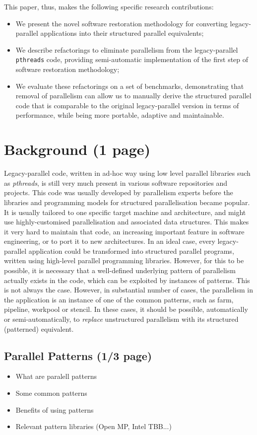 \documentclass{llncs}
\begin{document}
This paper, thus, makes the following specific research contributions:
\begin{itemize}
    \item We present the novel software restoration methodology for converting legacy-parallel applications into their structured parallel equivalents;
    \item We describe refactorings to eliminate parallelism from the legacy-parallel \lstinline{pthreads} code, providing semi-automatic implementation of the first step of software restoration methodology;
    \item We evaluate these refactorings on a set of benchmarks, demonstrating that removal of parallelism can allow us to manually derive the structured parallel code that is comparable to the original legacy-parallel version in terms of performance, while being more portable, adaptive and maintainable.
\end{itemize}

\section{Background (1 page)}
Legacy-parallel code, written in ad-hoc way using low level parallel libraries such as \emph{pthreads}, is still very much present in various software repositories and projects. This code was usually developed by parallelism experts before the libraries and programming models for structured parallelisation became popular. It is usually tailored to one specific target machine and architecture, and might use highly-customised parallelisation and associated data structures. This makes it very hard to maintain that code, an increasing important feature in software engineering, or to port it to new architectures. In an ideal case, every legacy-parallel application could be transformed into structured parallel programs, written using high-level parallel programming libraries. However, for this to be possible, it is necessary that a well-defined underlying pattern of parallelism actually exists in the code, which can be exploited by instances of patterns. This is not always the case. However, in substantial number of cases, the parallelism in the application is an instance of one of the common patterns, such as farm, pipeline, workpool or stencil. In these cases, it should be possible, automatically or semi-automatically, to \emph{replace} unstructured parallelism with its structured (patterned) equivalent.   

\subsection{Parallel Patterns (1/3 page)}
\begin{itemize}
\item What are paralell patterns
\item Some common patterns
  \item Benefits of using patterns
  \item Relevant pattern libraries (Open MP, Intel TBB...)
\end{itemize}
\end{document}
